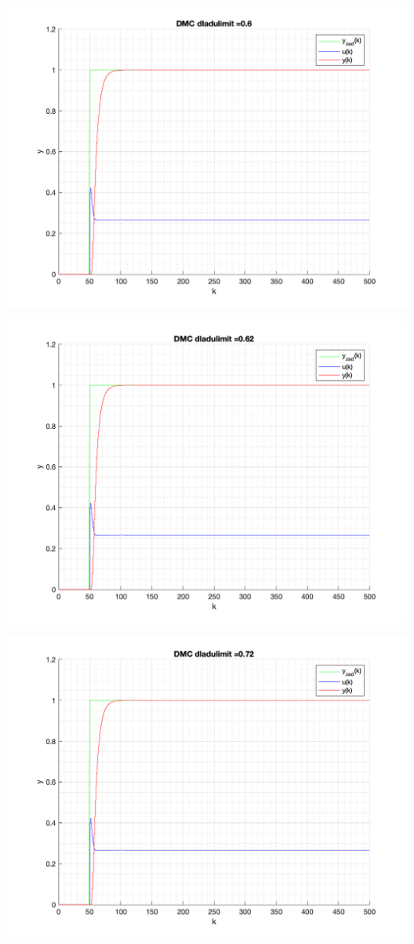 \documentclass[a4paper, 11pt]{article}
\begin{document}
\begin{enumerate}
 \includegraphics[width=\linewidth]{./ModelsP6_dulimit/P4_DMC_dulimit_0_6_png.png} 
 
 \includegraphics[width=\linewidth]{./ModelsP6_dulimit/P4_DMC_dulimit_0_62_png.png} 
 
 \includegraphics[width=\linewidth]{./ModelsP6_dulimit/P4_DMC_dulimit_0_72_png.png} 
 

\end{enumerate}
\end{document}
